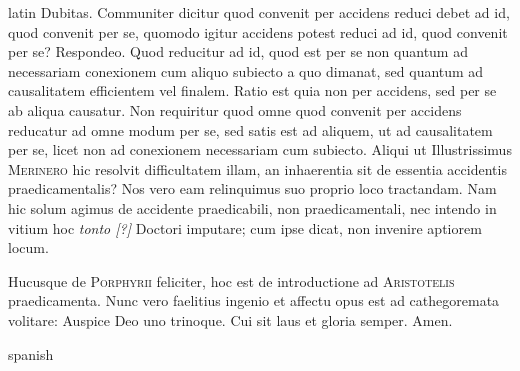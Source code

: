 \begin{otherlanguage*}{latin}
\pstart
  Dubitas. Communiter dicitur quod convenit per accidens reduci debet ad id, quod convenit per se, quomodo igitur accidens potest reduci ad id, quod convenit per se? Respondeo. Quod reducitur ad id, quod est per se non quantum ad necessariam conexionem cum aliquo subiecto a quo dimanat, sed quantum ad causalitatem efficientem vel finalem. Ratio est quia non per accidens, sed per se ab aliqua causatur. Non requiritur quod omne quod convenit per accidens reducatur ad omne modum per se, sed satis est ad aliquem, ut ad causalitatem per se, licet non ad conexionem necessariam cum subiecto. Aliqui ut Illustrissimus \textsc{Merinero}\index[persons]{} hic resolvit difficultatem illam, an inhaerentia sit de essentia accidentis praedicamentalis? Nos vero eam relinquimus suo proprio loco tractandam. Nam hic solum agimus de accidente praedicabili, non praedicamentali, nec intendo in vitium hoc \emph{tonto [?]} Doctori imputare; cum ipse dicat, non invenire aptiorem locum. 
\pend

\pstart
 Hucusque de  \textsc{Porphyrii} feliciter, hoc est de introductione ad \textsc{Aristotelis} praedicamenta. Nunc vero faelitius ingenio et affectu opus est ad cathegoremata volitare: Auspice Deo uno trinoque. Cui sit laus et gloria semper. Amen. 
\pend


\endnumbering
\end{otherlanguage*}


\cleardoublepage
\nocite{*}
\begin{otherlanguage*}{spanish}
\printbibliography
\end{otherlanguage*}


\cleardoublepage
\printindex[persons]



